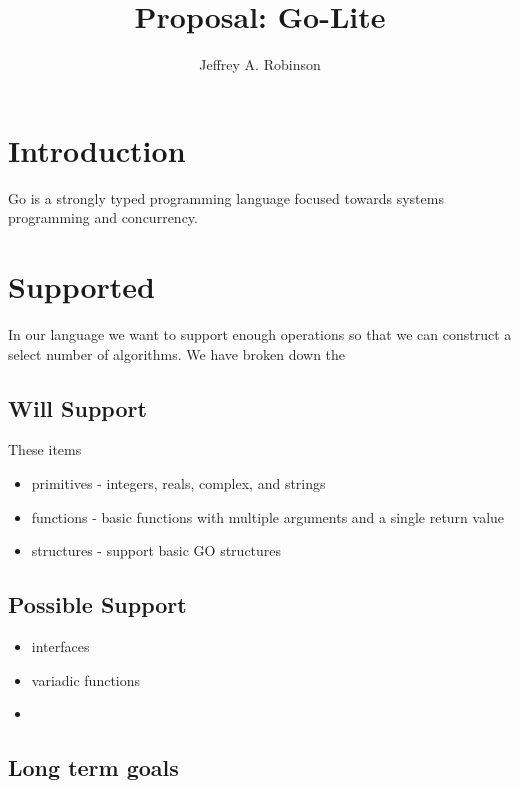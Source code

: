 \documentclass{article}
\title{Proposal: Go-Lite}
\author{Jeffrey A. Robinson}
\begin{document}
\section{Introduction}

Go is a strongly typed programming language focused towards systems programming and concurrency.

\section{Supported}

In our language we want to support enough operations so that we can construct a select number of algorithms.
We have broken down the  

\subsection{Will Support}

These items 

\begin{itemize}
    \item primitives - integers, reals, complex, and strings
    \item functions - basic functions with multiple arguments and a single return value
    \item structures - support basic GO structures
\end{itemize} 

\subsection{Possible Support}

\begin{itemize}
    \item interfaces
    \item variadic functions
    \item 
\end{itemize}

\subsection{Long term goals} 
\end{document}
